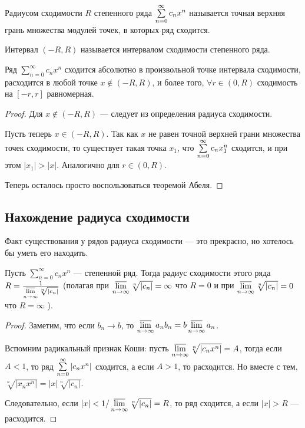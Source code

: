 \documentclass[a4paper, 12pt]{article}
\begin{document}
\begin{Def}
	Радиусом сходимости $R$ степенного ряда $\sum\limits_{n=0}^{\infty} c_nx^n$ называется точная верхняя грань множества модулей точек, в которых ряд сходится.
\end{Def}

\begin{Def}
Интервал $(-R, R)$ называется интервалом сходимости степенного ряда.
\end{Def}

\begin{Consequence}
	Ряд  $\sum\limits_{n = 0}^{\infty}c_n x^n$ сходится абсолютно в произвольной точке интервала сходимости, расходится в любой точке $x \not\in (-R, R)$, и более того, $\forall r \in (0, R)$ сходимость на $[-r, r]$ равномерная.
\end{Consequence}
\begin{proof}
Для $x \not \in (-R, R)$ --- следует из определения радиуса сходимости.

Пусть теперь $x \in (-R, R)$. Так как $x$ не равен точной верхней грани множества точек сходимости, то существует такая точка $x_1$, что $\sum\limits_{n=0}^{\infty} c_nx_1^n$ сходится, и при этом $|x_1| > |x|$. Аналогично для $r \in (0, R)$.

Теперь осталось просто воспользоваться теоремой Абеля.
\end{proof}

\subsection{Нахождение радиуса сходимости}

Факт существования у рядов радиуса сходимости --- это прекрасно, но хотелось бы уметь его находить.


\begin{Theorem} 
	Пусть $\sum\limits_{n = 0}^{\infty}c_n x^n$  --- степенной ряд. Тогда радиус сходимости этого ряда $R= \frac{1}{\varlimsup\limits_{n \to \infty} \sqrt[n]{|c_n|}}$ (полагая при $\varlimsup\limits_{n \to \infty} \sqrt[n]{|c_n|} = \infty$ что $R = 0$ и при $\varlimsup\limits_{n \to \infty} \sqrt[n]{|c_n|} = 0$ что $R = \infty$ ).
\end{Theorem}
\begin{proof}
	Заметим, что если $b_n \to b$, то $\varlimsup\limits_{n \to \infty} a_nb_n = b\varlimsup\limits_{n \to \infty} a_n$.
	
	Вспомним радикальный признак Коши: пусть $\varlimsup\limits_{n \to \infty} \sqrt[n]{|c_nx^n|} = A$, тогда если $A < 1$, то ряд $\sum\limits_{n=0}^{\infty} |c_nx^n|$ сходится, а если $A > 1$, то расходится. Но вместе с тем, $\sqrt[n]{|x_nx^n|} = |x|\sqrt[n]{|c_n|}$.
	
	Следовательно, если $|x| < 1 / \varlimsup\limits_{n \to \infty} \sqrt[n]{|c_n|} = R$, то ряд сходится, а если $|x| > R$ --- расходится.
\end{proof}
\end{document}
